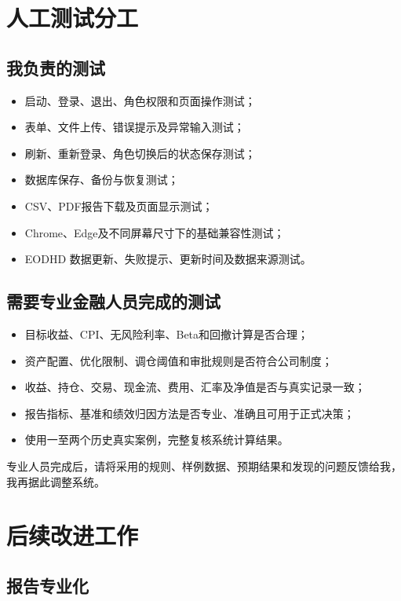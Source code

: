 \documentclass[11pt,a4paper]{ctexart}
\begin{document}
\section{人工测试分工}

\subsection*{我负责的测试}

\begin{itemize}
  \item 启动、登录、退出、角色权限和页面操作测试；
  \item 表单、文件上传、错误提示及异常输入测试；
  \item 刷新、重新登录、角色切换后的状态保存测试；
  \item 数据库保存、备份与恢复测试；
  \item CSV、PDF报告下载及页面显示测试；
  \item Chrome、Edge及不同屏幕尺寸下的基础兼容性测试；
  \item EODHD 数据更新、失败提示、更新时间及数据来源测试。
\end{itemize}

\subsection*{需要专业金融人员完成的测试}

\begin{itemize}
  \item 目标收益、CPI、无风险利率、Beta和回撤计算是否合理；
  \item 资产配置、优化限制、调仓阈值和审批规则是否符合公司制度；
  \item 收益、持仓、交易、现金流、费用、汇率及净值是否与真实记录一致；
  \item 报告指标、基准和绩效归因方法是否专业、准确且可用于正式决策；
  \item 使用一至两个历史真实案例，完整复核系统计算结果。
\end{itemize}

专业人员完成后，请将采用的规则、样例数据、预期结果和发现的问题反馈给我，我再据此调整系统。

\section{后续改进工作}

\subsection*{报告专业化}
\end{document}
